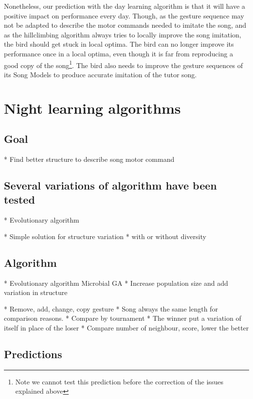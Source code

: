 \documentclass{report}
\begin{document}

Nonetheless, our prediction with the day learning algorithm is that it will have
a positive impact on performance every day. Though, as the gesture sequence may
not be adapted to describe the motor commands needed to imitate the song, and as
the hillclimbing algorithm always tries to locally improve the song imitation,
the bird should get stuck in local optima. The bird can no longer improve its
performance once in a local optima, even though it is far from reproducing a
good copy of the song\footnote{Note we cannot test this prediction before the correction of the issues explained above}. The bird also needs to improve the
gesture sequences of its Song Models to produce accurate imitation of the tutor
song.

\section{Night learning algorithms}\label{night-learning-algorithms}


\subsection{Goal}\label{goal}

  * Find better structure to describe song motor command
\subsection{Several variations of algorithm have been
tested}\label{several-variations-of-algorithm-have-been-tested}

  * Evolutionary algorithm

        * Simple solution for structure variation
    * with or without diversity
\subsection{Algorithm}\label{algorithm}

  * Evolutionary algorithm Microbial GA
  * Increase population size and add variation in structure

        * Remove, add, change, copy gesture
      * Song always the same length for comparison reasons.
    * Compare by tournament
        * The winner put a variation of itself in place of the loser
        * Compare number of neighbour, score, lower the better
\subsection{Predictions}\label{predictions}
\end{document}
